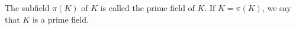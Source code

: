 The subfield $\pi(K)$ of $K$ is called the prime field of $K$. If $K = \pi(K)$, we say that $K$ is a prime field.

